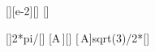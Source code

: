 [\cm][e-2][\meter]
[\second]

[]{2*pi/\TX}[\per\second]
[A\,\omega]{\AX*\omX}[\mps]
[\,A]{sqrt(3)/2*\AX}[\meter]
